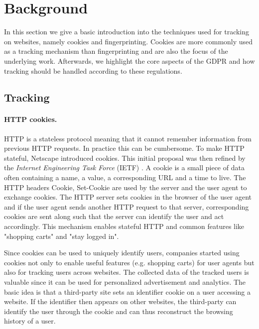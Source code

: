 \section{Background}
\label{sec:background}

In this section we give a basic introduction into the techniques used for tracking on websites, namely cookies and
fingerprinting. Cookies are more commonly used as a tracking mechanism than fingerprinting and are also the focus of
the underlying work. Afterwards, we highlight
the core aspects of the GDPR and how tracking should be handled according to these regulations.

\subsection{Tracking}

\paragraph{HTTP cookies.}

HTTP is a stateless protocol meaning that it cannot remember information from previous HTTP requests. In practice this
can be cumbersome. To make HTTP stateful, Netscape introduced cookies. This initial proposal was then refined by the
\emph{Internet Engineering Task Force} (IETF) \cite{rfc6265}. A cookie is a small piece of data often containing a name,
a value, a corresponding URL and a time to live. The HTTP headers Cookie, Set-Cookie are used by the server and the user agent to
exchange cookies. The HTTP server sets cookies in the browser of the user agent and if the user agent sends another HTTP
request to that server, corresponding cookies are sent along such that the server can identify the user and act accordingly. This
mechanism enables stateful HTTP and common features like "shopping carts" and "stay logged in".

Since cookies can be used to uniquely identify users, companies started using cookies not only to enable useful features
(e.g. shopping carts) for user agents but also for tracking users across websites. The collected data of the tracked
users is valuable since it can be used for
personalized advertisement and analytics. The basic idea is that a third-party site sets an identifier cookie on a
user accessing a website. If the identifier then appears on other websites, the third-party can identify the user
through the cookie and can thus reconstruct the browsing history of a user.

